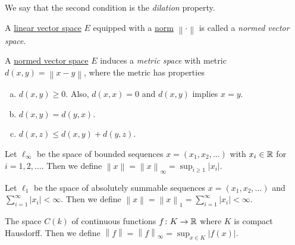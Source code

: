 \begin{notation}[Dilation]
	We say that the second condition is the \emph{dilation} property.
\end{notation}

\begin{definition}\label{def:normed-vector-space}
	A \hyperref[def:linear-vector-space]{linear vector space} \(E\) equipped with a \hyperref[def:norm]{norm} \(\left\lVert \cdot\right\rVert \) is called a \emph{normed vector space}.
\end{definition}

\begin{remark}
	A \hyperref[def:normed-vector-space]{normed vector space} \(E\) induces a \emph{metric space} with metric \(d(x, y) = \left\lVert x- y\right\rVert \), where the metric has properties
	\begin{enumerate}[(a)]
		\item \(d(x, y) \geq 0\). Also, \(d(x, x) = 0\) and \(d(x, y)\) implies \(x =y\).
		\item \(d(x, y) = d(y, x)\).
		\item \(d(x, z) \leq d(x, y) + d(y, z)\).
	\end{enumerate}
\end{remark}

\begin{eg}
	Let \(\ell _\infty \) be the space of bounded sequences \(x = (x_1, x_2, \ldots )\) with \(x_i\in \mathbb{\MakeUppercase{r}} \) for \(i = 1, 2, \ldots \). Then we define \(\left\lVert x\right\rVert = \left\lVert x\right\rVert _\infty = \sup _{i \geq 1}\left\vert x_i \right\vert \).
\end{eg}

\begin{eg}
	Let \(\ell _1\) be the space of absolutely summable sequences \(x = (x_1, x_2, \ldots)\) and \(\sum_{i=1}^{\infty} \left\vert x_i \right\vert < \infty\). Then we define \(\left\lVert x\right\rVert = \left\lVert x\right\rVert _1 = \sum_{i=1}^{\infty} \left\vert x_i \right\vert < \infty\).
\end{eg}

\begin{eg}
	The space \(C(k)\) of continuous functions \(f\colon K\to \mathbb{\MakeUppercase{r}} \) where \(K\) is compact Hausdorff. Then we define \(\left\lVert f\right\rVert = \left\lVert f\right\rVert _\infty = \sup _{x\in K}\left\vert f(x) \right\vert \).
\end{eg}


